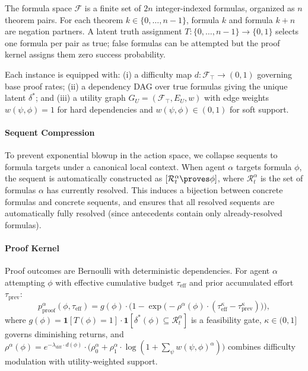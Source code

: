 The formula space $\mathcal{F}$ is a finite set of $2n$ integer-indexed formulas, organized as $n$ theorem pairs. For each theorem $k\in\{0,\ldots,n{-}1\}$, formula $k$ and formula $k+n$ are negation partners. A latent truth assignment $T:\{0,\ldots,n{-}1\}\to\{0,1\}$ selects one formula per pair as true; false formulas can be attempted but the proof kernel assigns them zero success probability.

Each instance is equipped with: (i) a difficulty map $d:\mathcal{F}_\top\to(0,1)$ governing base proof rates; (ii) a dependency DAG over true formulas giving the unique latent $\delta^*$; and (iii) a utility graph $G_U = (\mathcal{F}_\top, E_U, w)$ with edge weights $w(\psi,\phi)=1$ for hard dependencies and $w(\psi,\phi)\in(0,1)$ for soft support.

\paragraph{Sequent Compression}

To prevent exponential blowup in the action space, we collapse sequents to formula targets under a canonical local context. When agent $\alpha$ targets formula $\phi$, the sequent is automatically constructed as $[\mathcal{R}^\alpha_t \proves \phi]$, where $\mathcal{R}^\alpha_t$ is the set of formulas $\alpha$ has currently resolved. This induces a bijection between concrete formulas and concrete sequents, and ensures that all resolved sequents are automatically fully resolved (since antecedents contain only already-resolved formulas).


\paragraph{Proof Kernel}

Proof outcomes are Bernoulli with deterministic dependencies. For agent $\alpha$ attempting $\phi$ with effective cumulative budget $\tau_{\mathrm{eff}}$ and prior accumulated effort $\tau_{\mathrm{prev}}$:
\[
p^\alpha_{\mathrm{proof}}(\phi, \tau_{\mathrm{eff}}) = g(\phi)\cdot\Big(1 - \exp\!\big(-\rho^\alpha(\phi)\cdot(\tau_{\mathrm{eff}}^\kappa - \tau_{\mathrm{prev}}^\kappa)\big)\Big),
\]
where $g(\phi) = \mathbf{1}[T(\phi)=1]\cdot\mathbf{1}[\delta^*(\phi)\subseteq\mathcal{R}^\alpha_t]$ is a feasibility gate, $\kappa\in(0,1]$ governs diminishing returns, and $\rho^\alpha(\phi) = e^{-\lambda_{\mathrm{diff}}\cdot d(\phi)}\cdot\big(\rho_0^\alpha + \rho_1^\alpha\cdot\log(1 + \sum_{\psi} w(\psi,\phi)^\alpha)\big)$ combines difficulty modulation with utility-weighted support.

